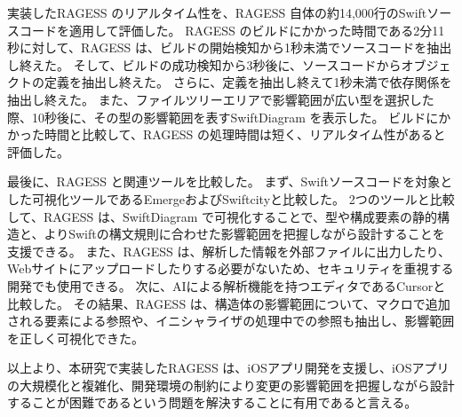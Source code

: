 \documentclass[uplatex]{jsarticle}
\begin{document}
\begin{AbstractBody}
実装したRAGESS のリアルタイム性を、RAGESS 自体の約14,000行のSwiftソースコードを適用して評価した。
RAGESS のビルドにかかった時間である2分11秒に対して、RAGESS は、ビルドの開始検知から1秒未満でソースコードを抽出し終えた。
そして、ビルドの成功検知から3秒後に、ソースコードからオブジェクトの定義を抽出し終えた。
さらに、定義を抽出し終えて1秒未満で依存関係を抽出し終えた。
また、ファイルツリーエリアで影響範囲が広い型を選択した際、10秒後に、その型の影響範囲を表すSwiftDiagram を表示した。
ビルドにかかった時間と比較して、RAGESS の処理時間は短く、リアルタイム性があると評価した。

最後に、RAGESS と関連ツールを比較した。
まず、Swiftソースコードを対象とした可視化ツールであるEmergeおよびSwiftcityと比較した。
2つのツールと比較して、RAGESS は、SwiftDiagram で可視化することで、型や構成要素の静的構造と、よりSwiftの構文規則に合わせた影響範囲を把握しながら設計することを支援できる。
また、RAGESS は、解析した情報を外部ファイルに出力したり、Webサイトにアップロードしたりする必要がないため、セキュリティを重視する開発でも使用できる。
次に、AIによる解析機能を持つエディタであるCursorと比較した。
その結果、RAGESS は、構造体の影響範囲について、マクロで追加される要素による参照や、イニシャライザの処理中での参照も抽出し、影響範囲を正しく可視化できた。

以上より、本研究で実装したRAGESS は、iOSアプリ開発を支援し、iOSアプリの大規模化と複雑化、開発環境の制約により変更の影響範囲を把握しながら設計することが困難であるという問題を解決することに有用であると言える。

\end{AbstractBody}
\end{document}
